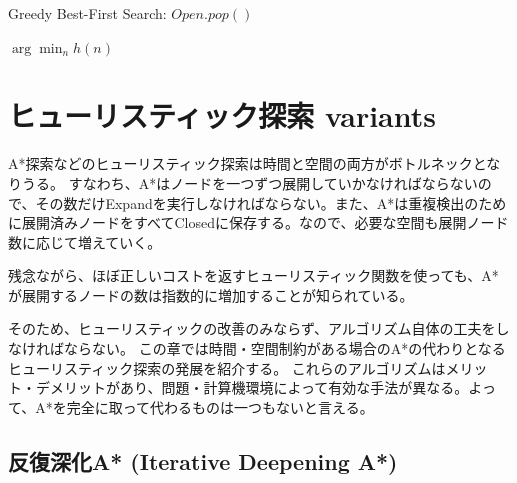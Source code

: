 \documentclass{report}
\begin{document}
\begin{algorithm}
\caption{Greedy Best-First Search: $Open.pop()$}
\label{alg:gfs-open}
	\Return $\arg \min_n h(n)$
\end{algorithm}

\chapter{ヒューリスティック探索 variants}
\label{ch:heuristic-serach-variants}
A*探索などのヒューリスティック探索は時間と空間の両方がボトルネックとなりうる。
すなわち、A*はノードを一つずつ展開していかなければならないので、その数だけExpandを実行しなければならない。また、A*は重複検出のために展開済みノードをすべてClosedに保存する。なので、必要な空間も展開ノード数に応じて増えていく。

残念ながら、ほぼ正しいコストを返すヒューリスティック関数を使っても、A*が展開するノードの数は指数的に増加することが知られている\cite{}。

そのため、ヒューリスティックの改善のみならず、アルゴリズム自体の工夫をしなければならない。
この章では時間・空間制約がある場合のA*の代わりとなるヒューリスティック探索の発展を紹介する。
これらのアルゴリズムはメリット・デメリットがあり、問題・計算機環境によって有効な手法が異なる。よって、A*を完全に取って代わるものは一つもないと言える。

\section{反復深化A* (Iterative Deepening A*)}
\label{sec:iterative-deepening-astar}
\end{document}
